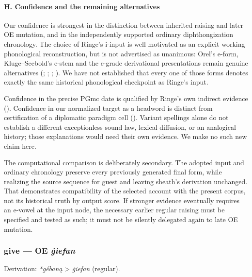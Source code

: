 \documentclass[
  british,
  a4paper,
]{article}
\begin{document}
\paragraph{H. Confidence and the remaining
alternatives}\label{h.-confidence-and-the-remaining-alternatives}

Our confidence is strongest in the distinction between inherited raising
and later OE mutation, and in the independently supported ordinary
diphthongization chronology. The choice of Ringe's i-input is well
motivated as an explicit working phonological reconstruction, but is not
advertised as unanimous: Orel's e-form, Kluge--Seebold's e-stem and the
e-grade derivational presentations remain genuine alternatives
(;
;
;
). We have not established
that every one of those forms denotes exactly the same historical
phonological checkpoint as Ringe's input.

Confidence in the precise PGmc date is qualified by Ringe's own indirect
evidence (). Confidence in
our normalized target as a headword is distinct from certification of a
diplomatic paradigm cell (). Variant spellings alone do not establish a different
exceptionless sound law, lexical diffusion, or an analogical history;
those explanations would need their own evidence. We make no such new
claim here.

The computational comparison is deliberately secondary. The adopted
input and ordinary chronology preserve every previously generated final
form, while realizing the source sequence for guest and leaving sheath's
derivation unchanged. That demonstrates compatibility of the selected
account with the present corpus, not its historical truth by output
score. If stronger evidence eventually requires an e-vowel at the input
node, the necessary earlier regular raising must be specified and tested
as such; it must not be silently delegated again to late OE mutation.

\subsubsection{\texorpdfstring{give --- OE
\emph{ġiefan}}{give --- OE ġiefan}}\label{give-oe-ux121iefan}

Derivation: \emph{*gébaną} \textgreater{} \emph{ġiefan} (regular).
\end{document}
